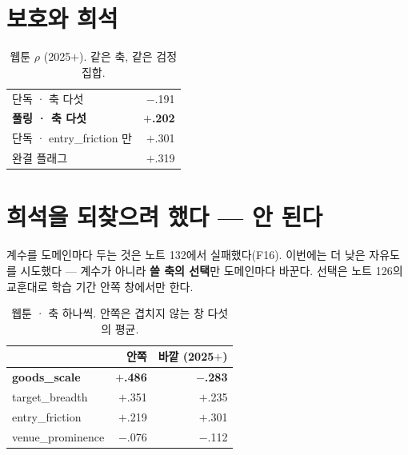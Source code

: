 \documentclass[10pt]{article}
\begin{document}

\section{보호와 희석}

\begin{table}[t]
\centering\tsize
\caption{웹툰 $\rho$ (2025$+$). 같은 축, 같은 검정 집합.}
\begin{tabular}{lr}
\toprule
단독 · 축 다섯 & $-$.191 \\
\textbf{풀링 · 축 다섯} & \textbf{$+$.202} \\
단독 · entry\_friction 만 & $+$.301 \\
완결 플래그 & $+$.319 \\
\bottomrule
\end{tabular}
\end{table}


\section{희석을 되찾으려 했다 --- 안 된다}

계수를 도메인마다 두는 것은 노트 132에서 실패했다(F16). 이번에는 더 낮은
자유도를 시도했다 --- 계수가 아니라 \textbf{쓸 축의 선택}만 도메인마다
바꾼다. 선택은 노트 126의 교훈대로 학습 기간 안쪽 창에서만 한다.

\begin{table}[t]
\centering\tsize
\caption{웹툰 · 축 하나씩. 안쪽은 겹치지 않는 창 다섯의 평균.}
\begin{tabular}{lrr}
\toprule
& 안쪽 & 바깥 (2025$+$) \\
\midrule
\textbf{goods\_scale} & \textbf{$+$.486} & \textbf{$-$.283} \\
target\_breadth & $+$.351 & $+$.235 \\
entry\_friction & $+$.219 & $+$.301 \\
venue\_prominence & $-$.076 & $-$.112 \\
\bottomrule
\end{tabular}
\end{table}
\end{document}
